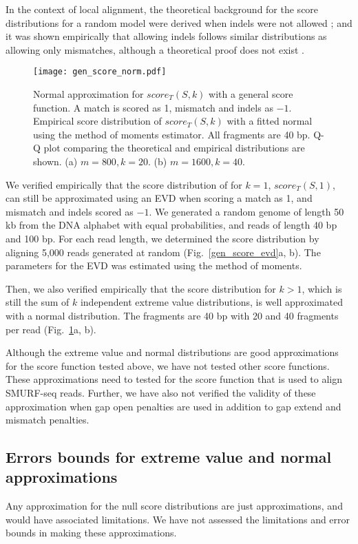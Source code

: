 In the context of local alignment, the theoretical background for the
score distributions for a random model were derived when indels were not
allowed \citep{karlin1990methods,karlin1990statistical}; and it was
shown empirically that allowing indels follows similar distributions as
allowing only mismatches, although a theoretical proof does not exist
\citep{pearson1998empirical,smith1985statistical,altschul199627}.

\begin{figure}[t!]
\centering
\texttt{[image: gen\_score\_norm.pdf]}
\caption[Normal approximation for $score_T(S,k)$ with a general score
  function]{
  Normal approximation for $score_T(S,k)$ with a general score function.
  A match is scored as 1, mismatch and indels as $-1$.
  Empirical score distribution of $score_T(S,k)$ with a fitted
  normal using the method of moments estimator. All fragments are 40 bp.
  Q-Q plot comparing the theoretical and empirical distributions are shown.
  (a) $m=800, k=20$.
  (b) $m=1600, k=40$.}
\label{gen_score_norm}
\end{figure}

We verified empirically that the score distribution of for $k=1$,
$score_T(S,1)$, can still be approximated using an EVD when scoring a
match as 1, and mismatch and indels scored as $-1$. We generated a
random genome of length 50 kb from the DNA alphabet with equal
probabilities, and reads of length 40 bp and 100 bp. For each read
length, we determined the score distribution by aligning 5,000 reads
generated at random (Fig.~\ref{gen_score_evd}a, b). The parameters for
the EVD was estimated using the method of moments.

Then, we also verified empirically that the score distribution for $k >
1$, which is still the sum of $k$ independent extreme value
distributions, is well approximated with a normal distribution. The
fragments are 40 bp with 20 and 40 fragments per read
(Fig.~\ref{gen_score_norm}a, b).


Although the extreme value and normal distributions are good
approximations for the score function tested above, we have not tested
other score functions. These approximations need to tested for the score
function that is used to align SMURF-seq reads. Further, we have also
not verified the validity of these approximation when gap open penalties
are used in addition to gap extend and mismatch penalties.

\subsection*{Errors bounds for extreme value and normal approximations}
Any approximation for the null score distributions are just
approximations, and would have associated limitations. We have not
assessed the limitations and error bounds in making these
approximations.

